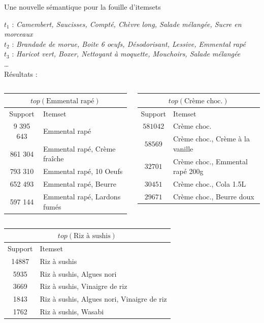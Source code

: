 \documentclass[table]{beamer}
\begin{document}
\begin{frame}[t]{Une nouvelle sémantique pour la fouille d'itemsets}
  \begin{footnotesize}
    $t_1$ : {\em Camembert, Saucisses, Compté, Chèvre long, Salade mélangée, Sucre en morceaux} \\
    $t_2$ : {\em Brandade de morue, Boite 6 oeufs, Désodorisant, Lessive, Emmental rapé} \\
    $t_3$ : {\em Haricot vert, Boxer, Nettoyant à moquette, Mouchoirs, Salade mélangée} \\
    \ldots\\
  \pause
  Résultats :
    \begin{columns}[c]
      \setlength{\tabcolsep}{1pt}
      \begin{tabular}{|c|l|}
        \multicolumn{2}{c}{$\mathit{top}(\text{Emmental rapé})$} \\ \hline
        Support & Itemset \\ \hline
        9 395 643 & Emmental rapé\\
        861 304 &	Emmental rapé, Crème fraîche\\
        793 310 &	Emmental rapé, 10 Oeufs \\
        652 493 &	Emmental rapé, Beurre \\
        597 144 &	Emmental rapé, Lardons fumés \\
        \hline
      \end{tabular}

      \begin{tabular}{|c|l|}
        \multicolumn{2}{c}{$\mathit{top}(\text{Crème choc.})$} \\ \hline
        Support & Itemset \\ \hline
        $581 042$ & Crème choc. \\
        $58 569$ & Crème choc., Crème à la vanille \\
        $32 701$ & Crème choc., Emmental rapé 200g \\
        $30 451$ & Crème choc., Cola 1.5L\\
        $29 671$ & Crème choc., Beurre doux\\
        \hline
      \end{tabular}
    \end{columns}
    \begin{center}
    \begin{tabular}{|c|l|}
      \multicolumn{2}{c}{$\mathit{top}(\text{Riz à sushis})$} \\ \hline
      Support & Itemset \\ \hline
      14887  & Riz à sushis \\
      5935   & Riz à sushis, Algues nori \\
      3669  & Riz à sushis, Vinaigre de riz \\
      1843   & Riz à sushis, Algues nori, Vinaigre de riz \\
      1762   & Riz à sushis, Wasabi \\
      \hline
    \end{tabular}


\end{center}
\end{footnotesize}
\end{frame}
\end{document}
